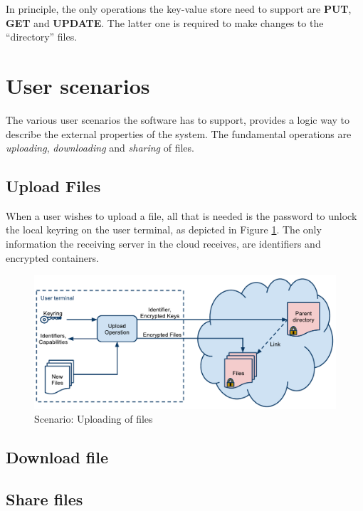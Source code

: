 \documentclass[english,12pt,a4paper]{book}
\begin{document}
In principle, the only operations the key-value store need to support are
\textbf{PUT}, \textbf{GET} and \textbf{UPDATE}. The latter one is required to
make changes to the ``directory'' files.



\section{User scenarios}

The various user scenarios the software has to support, provides a logic way to
describe the external properties of the system. The fundamental operations are
\emph{uploading}, \emph{downloading} and \emph{sharing} of files.

\subsection{Upload Files}

When a user wishes to upload a file, all that is needed is the password to
unlock the local keyring on the user terminal, as depicted in Figure
\ref{fig:arch:upload}. The only information the receiving server in the cloud
receives, are identifiers and encrypted containers.

\begin{figure}[h!]
    \centering
    \includegraphics[width=\columnwidth]{ArchitectureUpload.pdf}
    \caption{Scenario: Uploading of files}
    \label{fig:arch:upload}
\end{figure}

\subsection{Download file}

\subsection{Share files}
\end{document}
